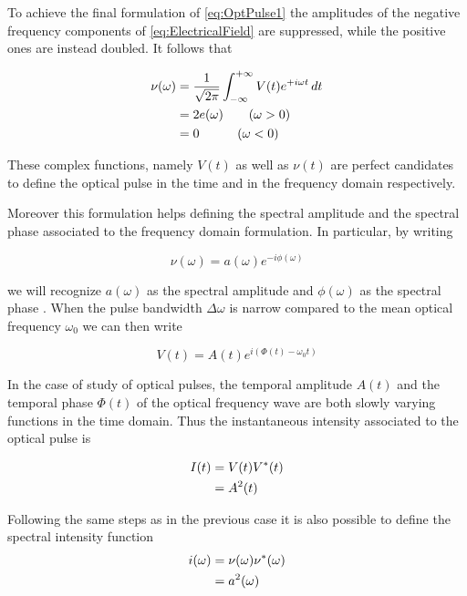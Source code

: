 To achieve the final formulation of \autoref{eq:OptPulse1} the amplitudes of the negative frequency components of \autoref{eq:ElectricalField} are suppressed, while the positive ones are instead doubled.
It follows that 

\begin{align}
\nu(\omega) &= \frac{1}{\sqrt{2\pi}}\int_{-\infty}^{+\infty} V(t)e^{+i\omega t}\, dt \notag \\
            &= 2e(\omega) \quad \quad (\omega > 0) \notag \\
            &= 0  \quad \quad \quad (\omega < 0)
\label{eq:OptPulseFreq}
\end{align}

These complex functions, namely $V(t)$ as well as $\nu (t)$ are perfect candidates to define the optical pulse in the time and in the frequency domain respectively.

Moreover this formulation helps defining the spectral amplitude and the spectral phase associated to the frequency domain formulation.
In particular, by writing

\begin{equation}
\nu (\omega) = a(\omega) e^{-i\phi (\omega)}
\label{eq:SpecFeatures}
\end{equation}

we will recognize $a(\omega)$ as the spectral amplitude and $\phi (\omega)$ as the spectral phase \cite{Bradley1974}.
When the pulse bandwidth $\Delta \omega$ is narrow compared to the mean optical frequency $\omega _0$ we can then write 

\begin{equation}
    V(t)=A(t)e^{i(\Phi (t)-\omega _{0} t )}
\label{eq:OptSynthetic}
\end{equation}

In the case of study of optical pulses, the temporal amplitude $A(t)$ and the temporal phase $\Phi (t)$ of the optical frequency wave are both slowly varying functions in the time domain. Thus the instantaneous intensity associated to the optical pulse is 

\begin{align}
    I(t) &= V(t)V^{*}(t) \notag \\
         &= A^{2}(t)
\label{eq:OptIntensity}
\end{align}

Following the same steps as in the previous case it is also possible to define the spectral intensity function
\begin{align}
    i(\omega) &= \nu (\omega)\nu ^{*}(\omega) \notag \\
              &= a^2 (\omega)
\label{eq:OptFreqIntensity}
\end{align}

